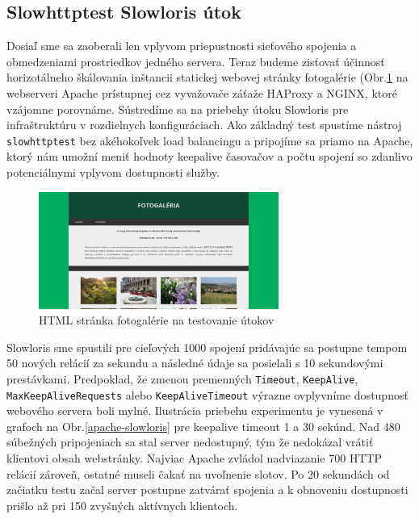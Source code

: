 \documentclass[12pt, a4paper]{article}
\begin{document}
\subsection{Slowhttptest Slowloris útok}
Dosiaľ sme sa zaoberali len vplyvom priepustnosti sieťového spojenia a obmedzeniami prostriedkov jedného
servera. Teraz budeme zisťovať účinnosť horizotálneho škálovania inštancii statickej webovej stránky 
fotogalérie (Obr.\ref{gallery-website} na webserveri Apache prístupnej cez vyvažovače záťaže HAProxy a NGINX, 
ktoré vzájomne porovnáme. Sústredíme sa na priebehy útoku Slowloris pre infraštruktúru v rozdielnych 
konfiguráciach. Ako základný test spustíme nástroj \verb|slowhttptest| bez akéhokoľvek load balancingu
a pripojíme sa priamo na Apache, ktorý nám umožní meniť hodnoty keepalive časovačov a počtu spojení so 
zdanlivo potenciálnymi vplyvom dostupnosti služby.

\begin{figure}[h!]
	\centering
  	\includegraphics[width=0.7\textwidth]{images/website.png}
  	\caption{HTML stránka fotogalérie na testovanie útokov}
  	\label{gallery-website}
\end{figure}

Slowloris sme spustili pre cieľových 1000 spojení pridávajúc sa postupne tempom 50 nových relácií za sekundu
a následné údaje sa posielali s 10 sekundovými prestávkami. Predpoklad, že zmenou premenných \verb|Timeout|,
\verb|KeepAlive|, \verb|MaxKeepAliveRequests| alebo \verb|KeepAliveTimeout| výrazne ovplyvníme dostupnosť
webového servera boli mylné. Ilustrácia priebehu experimentu je vynesená v grafoch na 
Obr.\ref{apache-slowloris} pre keepalive timeout 1 a 30 sekúnd. Nad 480 súbežných pripojeniach sa stal
server nedostupný, tým že nedokázal vrátiť klientovi obsah webstránky. Najviac Apache zvládol nadviazanie
700 HTTP relácií zároveň, ostatné museli čakať na uvoľnenie slotov. Po 20 sekundách od začiatku testu
začal server postupne zatvárať spojenia a k obnoveniu dostupnosti prišlo až pri 150 zvyšných aktívnych
klientoch.
\end{document}
